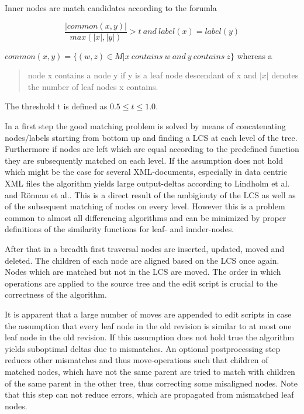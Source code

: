 Inner nodes are match candidates according to the forumla 

\begin{equation}
\frac{|common(x, y)|}{max(|x|,|y|)} > t\ and\ label(x) = label(y)
\end{equation}

$common(x,y) = \{(w,z) \in M | x\ contains\ w\ and\ y\ contains\ z\}$ whereas a \begin{quote}node x contains a node y if y is a leaf node descendant of x and $|x|$ denotes the number of leaf nodes x contains.\end{quote} The threshold t is defined as $0.5 \leq t \leq 1.0$.

In a first step the good matching problem is solved by means of concatenating nodes/labels starting from bottom up and finding a LCS at each level of the tree. Furthermore if nodes are left which are equal according to the predefined function they are subsequently matched on each level. If the assumption does not hold which might be the case for several XML-documents, especially in data centric XML files the algorithm yields large output-deltas according to Lindholm et al.\cite{lindholm2006fast} and Rönnau et al.\cite{ronnau2009efficient}. This is a direct result of the ambigiouty of the LCS as well as of the subsequent matching of nodes on every level. However this is a problem common to almost all differencing algorithms and can be minimized by proper definitions of the similarity functions for leaf- and innder-nodes.

After that in a breadth first traversal nodes are inserted, updated, moved and deleted. The children of each node are aligned based on the LCS once again. Nodes which are matched but not in the LCS are moved. The order in which operations are applied to the source tree and the edit script is crucial to the correctness of the algorithm.

It is apparent that a large number of moves are appended to edit scripts in case the assumption that every leaf node in the old revision is similar to at most one leaf node in the old revision. If this assumption does not hold true the algorithm yields suboptimal deltas due to mismatches. An optional postprocessing step reduces other mismatches and thus move-operations such that children of matched nodes, which have not the same parent are tried to match with children of the same parent in the other tree, thus correcting some misaligned nodes. Note that this step can not reduce errors, which are propagated from mismatched leaf nodes.

